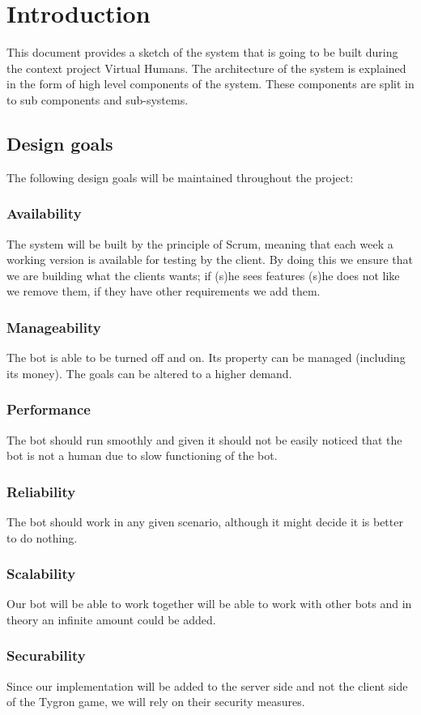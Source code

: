 \section{Introduction}

This document provides a sketch of the system that is going to be built during the context project Virtual Humans. The architecture of the system is explained in the form of high level components of the system. These components are split in to sub components and sub-systems.

\subsection{Design goals}
The following design goals will be maintained throughout the project:

\subsubsection{Availability}
The system will be built by the principle of Scrum, meaning that each week a working version is available for testing by the client. By doing this we ensure that we are building what the clients wants; if (s)he sees features (s)he does not like we remove them, if they have other requirements we add them. 

\subsubsection{Manageability}
The bot is able to be turned off and on. Its property can be managed (including its money). The goals can be altered to a higher demand.

\subsubsection{Performance}
The bot should run smoothly and given it should not be easily noticed that the bot is not a human due to slow functioning of the bot.

\subsubsection{Reliability}
The bot should work in any given scenario, although it might decide it is better to do nothing.

\subsubsection{Scalability}
Our bot will be able to work together will be able to work with other bots and in theory an infinite amount could be added.

\subsubsection{Securability}
Since our implementation will be added to the server side and not the client side of the Tygron game, we will rely on their security measures.

\newpage